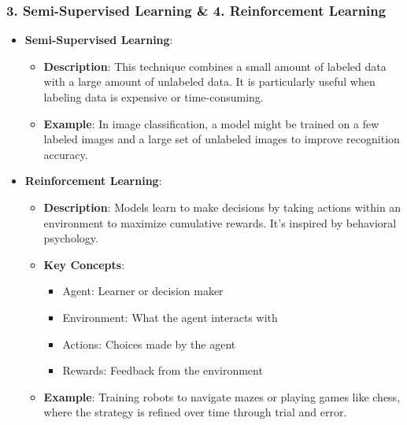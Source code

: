 \documentclass[aspectratio=169]{beamer}
\begin{document}
\begin{frame}[fragile]
    \frametitle{3. Semi-Supervised Learning \& 4. Reinforcement Learning}
    \begin{itemize}
        \item \textbf{Semi-Supervised Learning}:
        \begin{itemize}
            \item \textbf{Description}: This technique combines a small amount of labeled data with a large amount of unlabeled data. It is particularly useful when labeling data is expensive or time-consuming.
            \item \textbf{Example}: In image classification, a model might be trained on a few labeled images and a large set of unlabeled images to improve recognition accuracy.
        \end{itemize}
        \item \textbf{Reinforcement Learning}:
        \begin{itemize}
            \item \textbf{Description}: Models learn to make decisions by taking actions within an environment to maximize cumulative rewards. It’s inspired by behavioral psychology.
            \item \textbf{Key Concepts}:
            \begin{itemize}
                \item Agent: Learner or decision maker
                \item Environment: What the agent interacts with
                \item Actions: Choices made by the agent
                \item Rewards: Feedback from the environment
            \end{itemize}
            \item \textbf{Example}: Training robots to navigate mazes or playing games like chess, where the strategy is refined over time through trial and error.
        \end{itemize}
    \end{itemize}
\end{frame}
\end{document}
